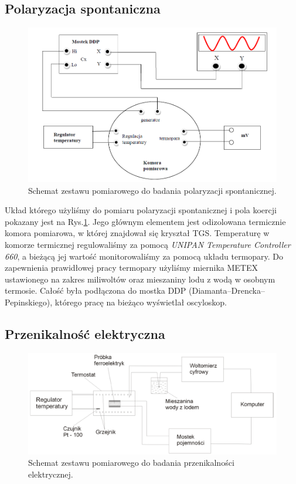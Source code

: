 \documentclass{article}
\begin{document}
\subsection{Polaryzacja spontaniczna}

\begin{figure}[!h]
	\centering
 	\includegraphics[width=0.7\linewidth]{setup1.png}
 	\caption{Schemat zestawu pomiarowego do badania polaryzacji spontanicznej.}
 	\label{fig:setup1}
\end{figure}

Układ którego użyliśmy do pomiaru polaryzacji spontanicznej i pola koercji pokazany jest na Rys.\ref{fig:setup1}. Jego głównym elementem jest odizolowana termicznie komora pomiarowa, w której znajdował się kryształ TGS. Temperaturę w komorze termicznej regulowaliśmy za pomocą \textit{UNIPAN Temperature Controller 660}, a bieżącą jej wartość monitorowaliśmy za pomocą układu termopary. Do zapewnienia prawidłowej pracy termopary użyliśmy miernika METEX ustawionego na zakres miliwoltów oraz mieszaniny lodu z wodą w osobnym termosie. Całość była podłączona do mostka DDP (Diamanta–Drencka–Pepinskiego), którego pracę na bieżąco wyświetlał oscyloskop.

\subsection{Przenikalność elektryczna}

\begin{figure}[!h]
	\centering
	\includegraphics[width=0.8\linewidth]{setup3.png}
	\caption{Schemat zestawu pomiarowego do badania przenikalności elektrycznej.}
	\label{fig:setup3}
\end{figure}
\end{document}
